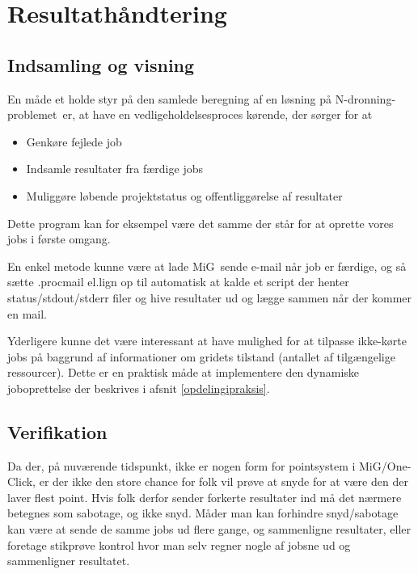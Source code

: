 \documentclass[draft,a4paper,11pt]{article}
\newcommand{\mig}{MiG}
\newcommand{\oc}{One-Click}
\newcommand{\nq}{N-dronning-problemet}
\begin{document}




\section{Resultathåndtering}\label{resultatindsamling}
\subsection{Indsamling og visning}
En måde et holde styr på den samlede beregning af en løsning på \nq\ er, at have en vedligeholdelsesproces kørende, der sørger for at 
\begin{itemize}
	\item Genkøre fejlede job
	\item Indsamle resultater fra færdige jobs
	\item Muliggøre løbende projektstatus og offentliggørelse af resultater 
\end{itemize}
Dette program kan for eksempel være det samme der står for at oprette vores jobs i første omgang. 

En enkel metode kunne være at lade \mig\ sende e-mail når job er færdige, og så sætte .procmail el.lign op til automatisk at kalde et script der henter status/stdout/stderr filer og hive resultater ud og lægge sammen når der
kommer en mail.

Yderligere kunne det være interessant at have mulighed for at tilpasse ikke-kørte jobs på baggrund af informationer om gridets tilstand (antallet af tilgængelige ressourcer). Dette er en praktisk måde at implementere den dynamiske joboprettelse der beskrives i afsnit \ref{opdelingipraksis}. 

\subsection{Verifikation}
Da der, på nuværende tidspunkt, ikke er nogen form for pointsystem i \mig/\oc,
er der ikke den store chance for folk vil prøve at snyde for at være den der
laver flest point. Hvis folk derfor sender forkerte resultater ind må det
nærmere betegnes som sabotage, og ikke snyd. Måder man kan forhindre
snyd/sabotage kan være at sende de samme jobs ud flere gange, og sammenligne
resultater, eller foretage stikprøve kontrol hvor man selv regner nogle af
jobsne ud og sammenligner resultatet. 
\end{document}
